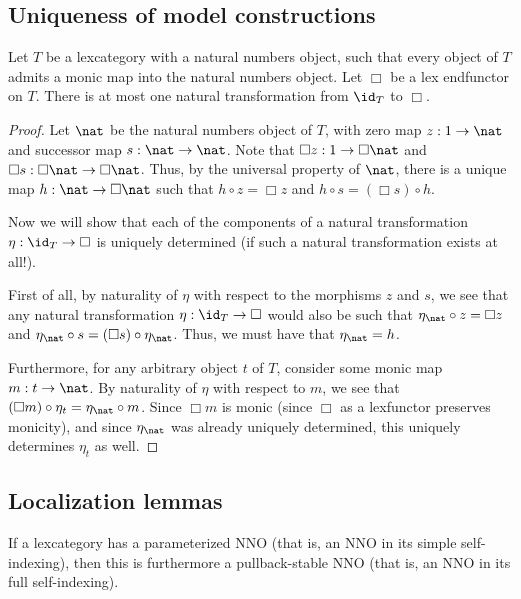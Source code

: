 \subsection{Uniqueness of model constructions}
\begin{lemma}
Let $T$ be a lexcategory with a natural numbers object, such that every object of $T$ admits a monic map into the natural numbers object. Let $\Box$ be a lex endfunctor on $T$. There is at most one natural transformation from $\id_T$ to $\Box$.
\end{lemma}
\begin{proof}
Let $\nat$ be the natural numbers object of $T$, with zero map $z : 1 \to \nat$ and successor map $s : \nat \to \nat$. Note that $\Box z : 1 \to \Box \nat$ and $\Box s : \Box \nat \to \Box \nat$. Thus, by the universal property of $\nat$, there is a unique map $h : \nat \to \Box \nat$ such that $h \circ z = \Box z$ and $h \circ s = (\Box s) \circ h$.

Now we will show that each of the components of a natural transformation $\eta : \id_T \to \Box$ is uniquely determined (if such a natural transformation exists at all!).

First of all, by naturality of $\eta$ with respect to the morphisms $z$ and $s$, we see that any natural transformation $\eta : \id_T \to \Box$ would also be such that $\eta_{\nat} \circ z = \Box z$ and $\eta_{\nat} \circ s = (\Box s) \circ \eta_{\nat}$. Thus, we must have that $\eta_{\nat} = h$.

Furthermore, for any arbitrary object $t$ of $T$, consider some monic map $m : t \to \nat$. By naturality of $\eta$ with respect to $m$, we see that $(\Box m) \circ \eta_t = \eta_{\nat} \circ m$. Since $\Box m$ is monic (since $\Box$ as a lexfunctor preserves monicity), and since $\eta_{\nat}$ was already uniquely determined, this uniquely determines $\eta_t$ as well.
\end{proof}

\subsection{Localization lemmas}
\begin{lemma}
If a lexcategory has a parameterized NNO (that is, an NNO in its simple self-indexing), then this is furthermore a pullback-stable NNO (that is, an NNO in its full self-indexing).
\end{lemma}


